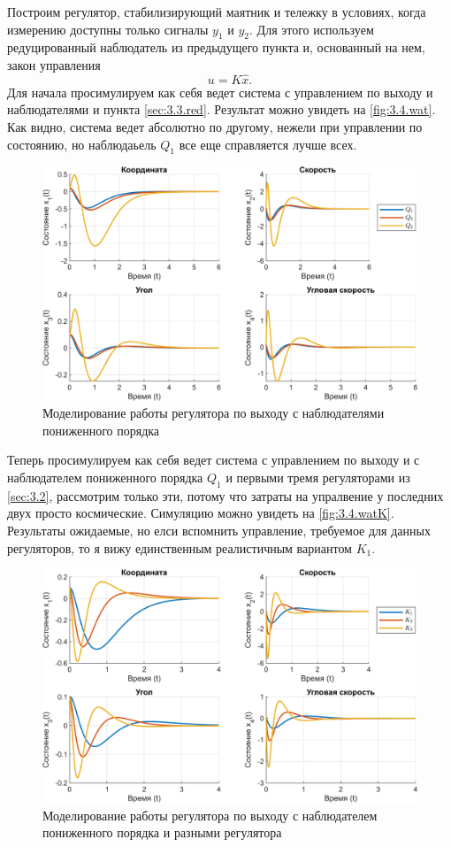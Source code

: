 Построим регулятор, стабилизирующий маятник и тележку в условиях, 
когда измерению доступны только сигналы $y_1$ и $y_2$. Для
этого используем редуцированный наблюдатель из предыдущего пункта 
и, основанный на нем, закон управления
\begin{equation*}
    u=K\hat x.
\end{equation*}
Для начала просимулируем как себя ведет система с управлением по выходу и 
наблюдателями и пункта \autoref{sec:3.3.red}. Результат можно увидеть на
\autoref{fig:3.4.wat}. Как видно, система ведет абсолютно по другому, нежели при
управлении по состоянию, но наблюдаьель $Q_1$ все еще справляется лучше всех.
\begin{figure}[H]
    \centering
    \includegraphics[width=\linewidth]{figs/3.4.wat.png}
    \caption{Моделирование работы регулятора по выходу 
    с наблюдателями пониженного порядка}
    \label{fig:3.4.wat}
\end{figure}
\noindent Теперь просимулируем как себя ведет система с управлением по выходу и
с наблюдателем пониженного порядка $Q_1$ и первыми тремя 
регуляторами из \autoref{sec:3.2}, рассмотрим только эти, потому что
затраты на упралвение у последних двух просто космические.
Симуляцию можно увидеть на \autoref{fig:3.4.watK}. Результаты ожидаемые, но
елси вспомнить управление, требуемое для данных регуляторов, то
я вижу единственным реалистичным вариантом $K_1$.
\begin{figure}[H]
    \centering
    \includegraphics[width=\linewidth]{figs/3.4.watK.png}
    \caption{Моделирование работы регулятора по выходу 
    с наблюдателем пониженного порядка и разными регулятора}
    \label{fig:3.4.watK}
\end{figure}
